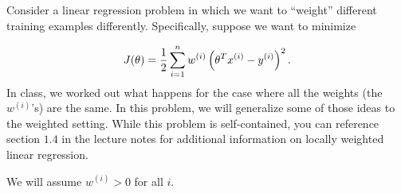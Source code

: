 \item {} Consider a linear regression problem in which
we want to ``weight'' different training examples differently.  Specifically,
suppose we want to minimize
%

\begin{equation*}
	J(\theta) = \frac{1}{2} \sum_{i=1}^{n} w^{(i)}
		\left(\theta^Tx^{(i)} - y^{(i)}\right)^2.
\end{equation*}
%
In class, we worked out what happens for the case where all the weights (the $w^{(i)}$'s) are the same. In this problem, we will generalize some of those ideas to the weighted setting. While this problem is self-contained, you can reference section $1.4$ in the lecture notes for additional information on locally weighted linear regression.

We will assume $w^{(i)} > 0$ for all $i$.

